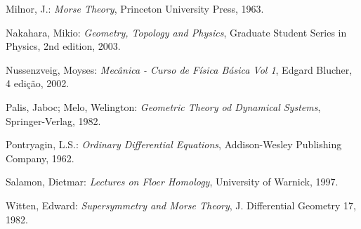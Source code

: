 \documentclass[12pt]{book}
\begin{document}
\begin{thebibliography}{9}
		Milnor, J.:
		\emph{Morse Theory},
		Princeton University Press, 1963.
		
		Nakahara, Mikio:
		\emph{Geometry, Topology and Physics},
		Graduate Student Series in Physics, 2nd edition,
		2003.
		
		Nussenzveig, Moyses:
		\emph{Mecânica - Curso de Física Básica Vol 1},
		Edgard Blucher, 4 edição,
		2002.
		
		Palis, Jaboc; Melo, Welington:
		\emph{Geometric Theory od Dynamical Systems},
		Springer-Verlag,
		1982.
		
		Pontryagin, L.S.:
		\emph{Ordinary Differential Equations},
		Addison-Wesley Publishing Company,
		1962.
		
		Salamon, Dietmar:
		\emph{Lectures on Floer Homology},
		University of Warnick,
		1997.
		
		Witten, Edward:
		\emph{Supersymmetry and Morse Theory},
		J. Differential Geometry 17,
		1982.
	\end{thebibliography}
	
\end{document}
